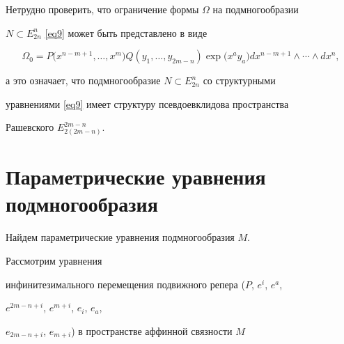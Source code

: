 Нетрудно проверить, что ограничение формы $\Omega$ на подмногообразии


$N\subset E^n_{2n}$ \eqref{eq9} может быть представлено в виде


$$


\Omega_0=P\big(x^{n-m+1}, \dotsc, x^m\big)Q\left(y_1, \dotsc, y_{2m-


n}\right)\exp\big(x^ay_a\big) dx^{n-m+1}\wedge \dotsb\wedge dx^n,


$$


а это означает, что подмногообразие $N\subset E^n_{2n}$ со структурными


уравнениями \eqref{eq9} имеет структуру псевдоевклидова пространства


Рашевского $E^{2m-n}_{2(2m-n)}$.








\section{Параметрические уравнения подмногообразия}





Найдем параметрические уравнения подмногообразия $M$.


Рассмотрим уравнения


инфинитезимального перемещения подвижного репера ($P$, $e^i$, $e^a$,


$e^{2m-n+i}$, $e^{m+i}$, $e_i$, $e_a$,


$e_{2m-n+i}$, $e_{m+i}$) в пространстве аффинной связности $M$


